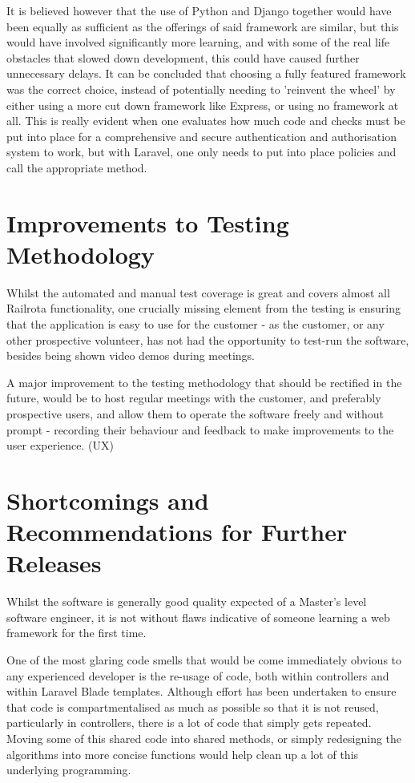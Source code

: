 It is believed however that the use of Python and Django together would have been equally as sufficient as the offerings of said framework are similar, but this would have involved significantly more learning, and with some of the real life obstacles that slowed down development, this could have caused further unnecessary delays. It can be concluded that choosing a fully featured framework was the correct choice, instead of potentially needing to 'reinvent the wheel' by either using a more cut down framework like Express, or using no framework at all. This is really evident when one evaluates how much code and checks must be put into place for a comprehensive and secure authentication and authorisation system to work, but with Laravel, one only needs to put into place policies and call the appropriate method. \cite{Laravel8}

\section{Improvements to Testing Methodology}
Whilst the automated and manual test coverage is great and covers almost all Railrota functionality, one crucially missing element from the testing is ensuring that the application is easy to use for the customer - as the customer, or any other prospective volunteer, has not had the opportunity to test-run the software, besides being shown video demos during meetings.

A major improvement to the testing methodology that should be rectified in the future, would be to host regular meetings with the customer, and preferably prospective users, and allow them to operate the software freely and without prompt - recording their behaviour and feedback to make improvements to the user experience. (UX)

\section{Shortcomings and Recommendations for Further Releases}
Whilst the software is generally good quality expected of a Master's level software engineer, it is not without flaws indicative of someone learning a web framework for the first time.

One of the most glaring code smells that would be come immediately obvious to any experienced developer is the re-usage of code, both within controllers and within Laravel Blade templates. Although effort has been undertaken to ensure that code is compartmentalised as much as possible so that it is not reused, particularly in controllers, there is a lot of code that simply gets repeated. Moving some of this shared code into shared methods, or simply redesigning the algorithms into more concise functions would help clean up a lot of this underlying programming.


